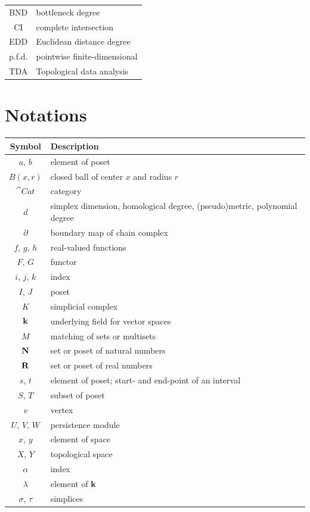\begin{tabular}{c|l}
  BND & bottleneck degree \\
  CI & complete intersection \\
  EDD & Euclidean distance degree \\
  p.f.d. & pointwise finite-dimensional \\
  TDA & Topological data analysis
\end{tabular}

\section*{Notations}

\begin{longtable}[l]{c|p{}}
  Symbol & Description \\
  \hline\endhead
  $a$, $b$ & element of poset \\
  $B(x, r)$ & closed ball of center $x$ and radius $r$ \\
  $\cat{Cat}$ & category \\
  $d$ & simplex dimension, homological degree, (pseudo)metric, polynomial degree \\
  $\partial$ & boundary map of chain complex \\
  $f$, $g$, $h$ & real-valued functions \\
  $F$, $G$ & functor \\
  $i$, $j$, $k$ & index \\
  $I$, $J$ & poset \\
  $K$ & simplicial complex \\
  $\mathbf{k}$ & underlying field for vector spaces \\
  $M$ & matching of sets or multisets \\
  $\mathbf{N}$ & set or poset of natural numbers \\
  $\mathbf{R}$ & set or poset of real numbers \\
  $s$, $t$ & element of poset; start- and end-point of an interval \\
  $S$, $T$ & subset of poset \\
  $v$ & vertex \\
  $U$, $V$, $W$ & persistence module \\
  $x$, $y$ & element of space \\
  $X$, $Y$ & topological space \\
  $\alpha$ & index \\
  $\lambda$ & element of $\mathbf{k}$ \\
  $\sigma$, $\tau$ & simplices \\
\end{longtable}

